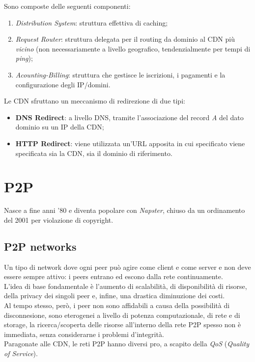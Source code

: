 Sono composte delle seguenti componenti:
\begin{enumerate}
    \item \textit{Distribution System}: struttura effettiva di caching;
    \item \textit{Request Router}: struttura delegata per il routing da dominio al CDN più \textit{vicino} (non necessariamente a livello geografico, tendenzialmente per tempi di \textit{ping});
    \item \textit{Acounting-Billing}: struttura che gestisce le iscrizioni, i pagamenti e la configurazione degli IP/domini.
\end{enumerate}
Le CDN sfruttano un meccanismo di redirezione di due tipi:
\begin{itemize}
    \item \textbf{DNS Redirect}: a livello DNS, tramite l'associazione del record \textit{A} del dato dominio su un IP della CDN;
    \item \textbf{HTTP Redirect}: viene utilizzata un'URL apposita in cui specificato viene specificata sia la CDN, sia il dominio di riferimento.
\end{itemize}

\section{P2P}
Nasce a fine anni '80 e diventa popolare con \textit{Napster}, chiuso da un ordinamento del 2001 per violazione di copyright. \\

\subsection{P2P networks}
Un tipo di network dove ogni peer può agire come client e come server e non deve essere sempre attivo: i peers entrano ed escono dalla rete continuamente. \\
L'idea di base fondamentale è l'aumento di scalabilità, di disponibilità di risorse, della privacy dei singoli peer e, infine, una drastica diminuzione dei costi. \\
Al tempo stesso, però, i peer non sono affidabili a causa della possibilità di disconnesione, sono eterogenei a livello di potenza computazionale, di rete e di storage, la ricerca/scoperta delle risorse all'interno della rete P2P spesso non è immediata, senza considerarne i problemi d'integrità. \\
Paragonate alle CDN, le reti P2P hanno diversi pro, a scapito della \textit{QoS} (\textit{Quality of Service}).

